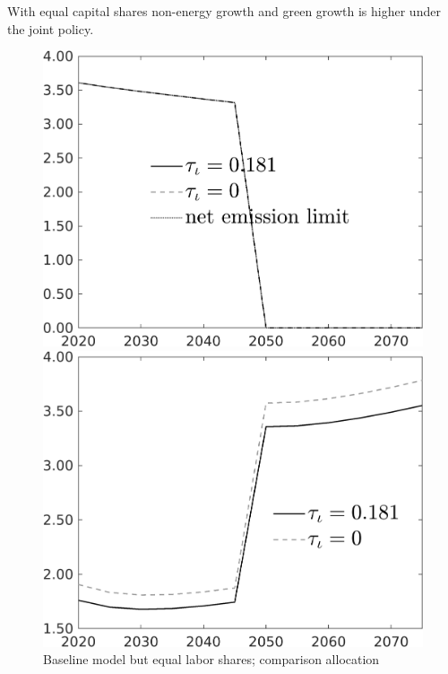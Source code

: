 \documentclass[12pt]{article}
\begin{document}
With equal capital shares non-energy growth and green growth is higher under the joint policy. 
\begin{figure}[h!!]
	\centering
	\caption{Baseline model but equal labor shares; comparison allocation}\label{fig:Leveltauf_nsk1_xgr0_noknow_equallab_notaul}
	\begin{minipage}[]{0.32\textwidth}
		\includegraphics[width=1\textwidth]{../../codding_model/own_basedOnFried/optimalPol_010922_revision/figures/all_13Sept22/CompTauf_bytaul_Equlab_Reg0_Emnet_spillover0_nsk0_xgr0_knspil0_sep0_LFlimit1_emsbase0_countec0_GovRev0_etaa0.79_lgd1.png}
	\end{minipage}		
	\begin{minipage}[]{0.32\textwidth}
		\includegraphics[width=1\textwidth]{../../codding_model/own_basedOnFried/optimalPol_010922_revision/figures/all_13Sept22/CompTauf_bytaul_Equlab_Reg0_tauf_spillover0_nsk0_xgr0_knspil0_sep0_LFlimit1_emsbase0_countec0_GovRev0_etaa0.79_lgd1.png}

\end{minipage}
\end{figure}
\end{document}

